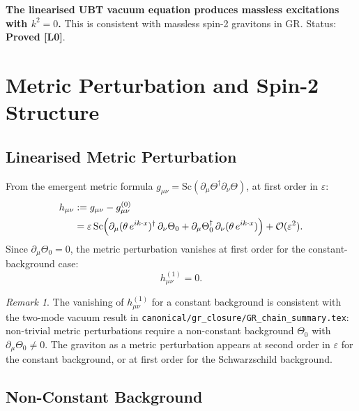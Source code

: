 \documentclass[11pt,a4paper]{article}
\theoremstyle{definition}
\theoremstyle{remark}
\newtheorem{remark}[theorem]{Remark}
\begin{document}
\begin{tcolorbox}[colback=green!5!white,colframe=green!75!black,
                  title={Result: Graviton Dispersion $k^2 = 0$}]
\textbf{The linearised UBT vacuum equation produces massless excitations
with $k^2 = 0$.}  This is consistent with massless spin-2 gravitons in GR.
Status: \textbf{Proved [L0]}.
\end{tcolorbox}

\section{Metric Perturbation and Spin-2 Structure}
\label{sec:spin2}

\subsection{Linearised Metric Perturbation}

From the emergent metric formula $g_{\mu\nu} = \mathrm{Sc}(\partial_\mu\Theta^\dagger
\partial_\nu\Theta)$, at first order in $\varepsilon$:
\begin{align}
  h_{\mu\nu} &:= g_{\mu\nu} - g_{\mu\nu}^{(0)}
  \notag\\
  &= \varepsilon\,\mathrm{Sc}\!\left(
     \partial_\mu(\theta\,e^{ik\cdot x})^\dagger\,\partial_\nu\Theta_0
     + \partial_\mu\Theta_0^\dagger\,\partial_\nu(\theta\,e^{ik\cdot x})
    \right) + \mathcal{O}(\varepsilon^2).
  \label{eq:h_munu}
\end{align}
Since $\partial_\mu\Theta_0 = 0$, the metric perturbation vanishes at first
order for the constant-background case:
\begin{equation}
  h_{\mu\nu}^{(1)} = 0.
  \label{eq:h_zero}
\end{equation}

\begin{remark}
The vanishing of $h_{\mu\nu}^{(1)}$ for a constant background is consistent
with the two-mode vacuum result in \texttt{canonical/gr\_closure/GR\_chain\_summary.tex}:
non-trivial metric perturbations require a non-constant background $\Theta_0$
with $\partial_\mu\Theta_0 \neq 0$.  The graviton as a metric perturbation
appears at second order in $\varepsilon$ for the constant background, or at
first order for the Schwarzschild background.
\end{remark}

\subsection{Non-Constant Background}
\end{document}
